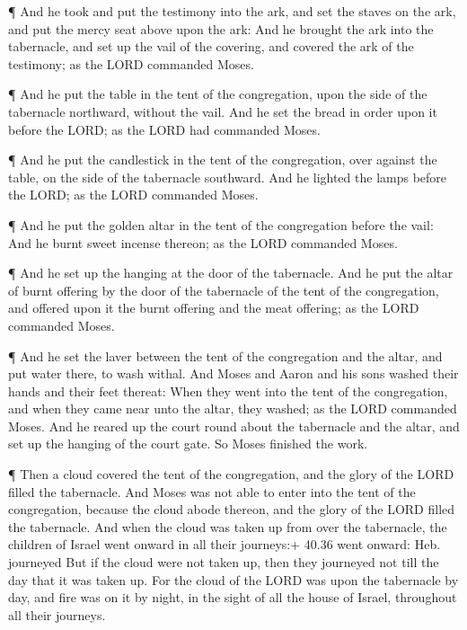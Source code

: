  ¶ And he took and put the testimony into the ark, and set
the staves on the ark, and put the mercy seat above upon the ark:
 And he brought the ark into the tabernacle, and set up the
vail of the covering, and covered the ark of the testimony; as the LORD
commanded Moses.

 ¶ And he put the table in the tent of the congregation,
upon the side of the tabernacle northward, without the vail.
 And he set the bread in order upon it before the LORD; as
the LORD had commanded Moses.

 ¶ And he put the candlestick in the tent of the
congregation, over against the table, on the side of the tabernacle
southward.  And he lighted the lamps before the LORD; as
the LORD commanded Moses.

 ¶ And he put the golden altar in the tent of the
congregation before the vail:  And he burnt sweet incense
thereon; as the LORD commanded Moses.

 ¶ And he set up the hanging at the door of the tabernacle.
 And he put the altar of burnt offering by the door of the
tabernacle of the tent of the congregation, and offered upon it the
burnt offering and the meat offering; as the LORD commanded Moses.

 ¶ And he set the laver between the tent of the
congregation and the altar, and put water there, to wash withal.
 And Moses and Aaron and his sons washed their hands and
their feet thereat:  When they went into the tent of the
congregation, and when they came near unto the altar, they washed; as
the LORD commanded Moses.  And he reared up the court round
about the tabernacle and the altar, and set up the hanging of the court
gate. So Moses finished the work.

 ¶ Then a cloud covered the tent of the congregation, and
the glory of the LORD filled the tabernacle.  And Moses was
not able to enter into the tent of the congregation, because the cloud
abode thereon, and the glory of the LORD filled the tabernacle.
 And when the cloud was taken up from over the tabernacle,
the children of Israel went onward in all their journeys:+ 40.36 went
onward: Heb. journeyed  But if the cloud were not taken up,
then they journeyed not till the day that it was taken up. 
For the cloud of the LORD was upon the tabernacle by day, and fire was
on it by night, in the sight of all the house of Israel, throughout all
their journeys.

